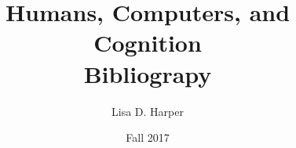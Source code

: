 \documentclass[12pt]{article}
\begin{document}
\title{Humans, Computers, and Cognition \\ Bibliograpy}
\author{Lisa D. Harper}
\date{Fall 2017}
\maketitle

\renewcommand{\clearpage}{} %




\end{document}
